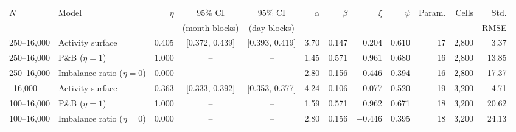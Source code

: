 \begin{tabular}{llrccrrrrrrr}
\toprule
\(N\) & Model & \(\eta\) & 95\% CI & 95\% CI & \(\alpha\) & \(\beta\) & \(\xi\) & \(\psi\) & Param. & Cells & Std. \\
 &  &  & (month blocks) & (day blocks) &  &  &  &  &  &  & RMSE \\
\midrule
250--16,000 & Activity surface & 0.405 & [0.372, 0.439] & [0.393, 0.419] & 3.70 & 0.147 & 0.204 & 0.610 & 17 & 2,800 & 3.37 \\
250--16,000 & P\&B (\(\eta=1\)) & 1.000 & -- & -- & 1.45 & 0.571 & 0.961 & 0.680 & 16 & 2,800 & 13.85 \\
250--16,000 & Imbalance ratio (\(\eta=0\)) & 0.000 & -- & -- & 2.80 & 0.156 & $-$0.446 & 0.394 & 16 & 2,800 & 17.37 \\
\addlinespace
100--16,000 & Activity surface & 0.363 & [0.333, 0.392] & [0.353, 0.377] & 4.24 & 0.106 & 0.077 & 0.520 & 19 & 3,200 & 4.71 \\
100--16,000 & P\&B (\(\eta=1\)) & 1.000 & -- & -- & 1.59 & 0.571 & 0.962 & 0.671 & 18 & 3,200 & 20.62 \\
100--16,000 & Imbalance ratio (\(\eta=0\)) & 0.000 & -- & -- & 2.80 & 0.156 & $-$0.446 & 0.395 & 18 & 3,200 & 24.13 \\
\bottomrule
\end{tabular}
